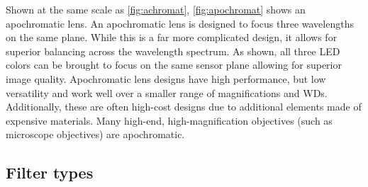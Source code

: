 Shown at the same scale as \ref{fig:achromat}, \ref{fig:apochromat} shows an apochromatic lens. An apochromatic lens is designed to focus three wavelengths on the same plane. While this is a far more complicated design, it allows for superior balancing across the wavelength spectrum. As shown, all three LED colors can be brought to focus on the same sensor plane allowing for superior image quality. Apochromatic lens designs have high performance, but low versatility and work well over a smaller range of magnifications and WDs. Additionally, these are often high-cost designs due to additional elements made of expensive materials. Many high-end, high-magnification objectives (such as microscope objectives) are apochromatic.

\subsection{Filter types}
